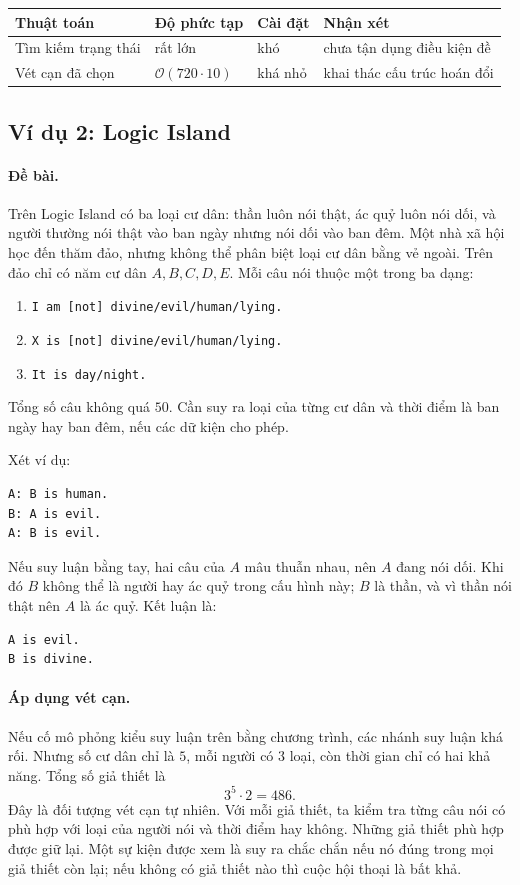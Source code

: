 \documentclass[11pt]{article}
\newcommand{\BigO}{\mathcal{O}}
\begin{document}
\begin{center}
\begin{tabular}{llll}
\textbf{Thuật toán} & \textbf{Độ phức tạp} & \textbf{Cài đặt} & \textbf{Nhận xét}\\
\hline
Tìm kiếm trạng thái & rất lớn & khó & chưa tận dụng điều kiện đề\\
Vét cạn đã chọn & \(\BigO(720\cdot 10)\) & khá nhỏ & khai thác cấu trúc hoán đổi
\end{tabular}
\end{center}

\subsection{Ví dụ 2: Logic Island}

\paragraph{Đề bài.}
Trên Logic Island có ba loại cư dân: thần luôn nói thật, ác quỷ luôn nói dối,
và người thường nói thật vào ban ngày nhưng nói dối vào ban đêm. Một nhà xã
hội học đến thăm đảo, nhưng không thể phân biệt loại cư dân bằng vẻ ngoài.
Trên đảo chỉ có năm cư dân \(A,B,C,D,E\). Mỗi câu nói thuộc một trong ba dạng:
\begin{enumerate}
  \item \texttt{I am [not] divine/evil/human/lying.}
  \item \texttt{X is [not] divine/evil/human/lying.}
  \item \texttt{It is day/night.}
\end{enumerate}
Tổng số câu không quá \(50\). Cần suy ra loại của từng cư dân và thời điểm là
ban ngày hay ban đêm, nếu các dữ kiện cho phép.

Xét ví dụ:
\begin{verbatim}
A: B is human.
B: A is evil.
A: B is evil.
\end{verbatim}
Nếu suy luận bằng tay, hai câu của \(A\) mâu thuẫn nhau, nên \(A\) đang nói
dối. Khi đó \(B\) không thể là người hay ác quỷ trong cấu hình này; \(B\) là
thần, và vì thần nói thật nên \(A\) là ác quỷ. Kết luận là:
\begin{verbatim}
A is evil.
B is divine.
\end{verbatim}

\paragraph{Áp dụng vét cạn.}
Nếu cố mô phỏng kiểu suy luận trên bằng chương trình, các nhánh suy luận khá
rối. Nhưng số cư dân chỉ là \(5\), mỗi người có \(3\) loại, còn thời gian chỉ
có hai khả năng. Tổng số giả thiết là
\[
  3^5\cdot 2=486.
\]
Đây là đối tượng vét cạn tự nhiên. Với mỗi giả thiết, ta kiểm tra từng câu
nói có phù hợp với loại của người nói và thời điểm hay không. Những giả thiết
phù hợp được giữ lại. Một sự kiện được xem là suy ra chắc chắn nếu nó đúng
trong mọi giả thiết còn lại; nếu không có giả thiết nào thì cuộc hội thoại là
bất khả.
\end{document}
